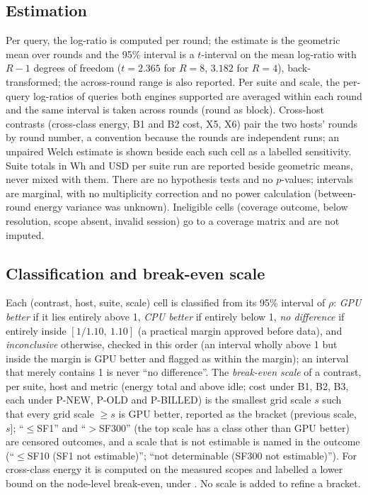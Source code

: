 \documentclass[sigconf]{acmart}
\begin{document}
\subsection{Estimation}
\label{sec:estimation}
Per query, the log-ratio is computed per round; the estimate is the geometric mean over rounds
and the 95\% interval is a $t$-interval on the mean log-ratio with $R-1$ degrees of freedom
($t = 2.365$ for $R = 8$, $3.182$ for $R = 4$), back-transformed; the across-round range is also
reported. Per suite and scale, the per-query log-ratios of queries both engines supported are
averaged within each round and the same interval is taken across rounds (round as block).
Cross-host contrasts (cross-class energy, B1 and B2 cost, X5, X6) pair the two hosts' rounds by
round number, a convention because the rounds are independent runs; an unpaired Welch estimate
is shown beside each such cell as a labelled sensitivity. Suite totals in Wh and USD per suite
run are reported beside geometric means, never mixed with them.
There are no hypothesis tests and no $p$-values; intervals are marginal, with no multiplicity
correction and no power calculation (between-round energy variance was unknown). Ineligible
cells (coverage outcome, below resolution, scope absent, invalid session) go to a coverage
matrix and are not imputed.

\subsection{Classification and break-even scale}
\label{sec:classification}
Each (contrast, host, suite, scale) cell is classified from its 95\% interval of $\rho$:
\emph{GPU better} if it lies entirely above 1, \emph{CPU better} if entirely below 1, \emph{no
difference} if entirely inside $[1/1.10,\ 1.10]$ (a practical margin approved before data), and
\emph{inconclusive} otherwise, checked in this order (an interval wholly above 1 but inside the
margin is GPU better and flagged as within the margin); an interval that merely contains 1 is never
``no difference''.
The \emph{break-even scale} of a contrast, per suite, host and metric (energy total and above
idle; cost under B1, B2, B3, each under P-NEW, P-OLD and P-BILLED) is the smallest grid scale $s$
such that every grid scale $\ge s$ is GPU better, reported as the bracket (previous scale, $s$];
``$\le$SF1'' and ``$>$SF300'' (the top scale has a class other than GPU better) are censored
outcomes, and a scale that is not estimable is named in the outcome (``$\le$SF10 (SF1 not estimable)''; ``not determinable (SF300 not estimable)'').
For cross-class energy it is computed on the
measured scopes and labelled a lower bound on the node-level break-even, under \NOne. No scale is
added to refine a bracket.
\end{document}
